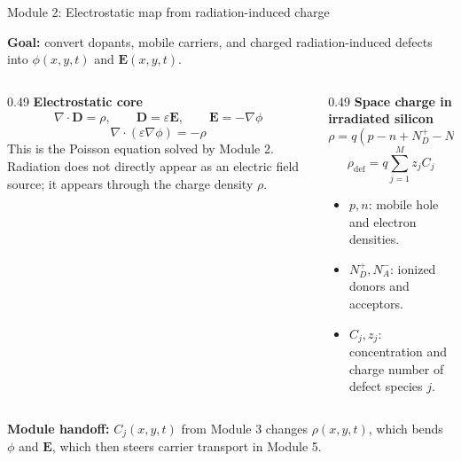\documentclass[aspectratio=169,9pt]{beamer}
\newcommand{\Evec}{\bm{E}}
\newcommand{\Dvec}{\bm{D}}
\newcommand{\rhoDef}{\rho_{\mathrm{def}}}
\begin{document}
\begin{frame}{Module 2: Electrostatic map from radiation-induced charge}
\footnotesize
\vspace{-4mm}
\begin{bluebox}
\centering\small
\textbf{Goal:} convert dopants, mobile carriers, and charged radiation-induced defects into \(\phi(x,y,t)\) and \(\Evec(x,y,t)\).
\end{bluebox}

\vspace{1mm}
\begin{columns}[T,totalwidth=\textwidth]
\begin{column}{0.49\textwidth}
\textbf{Electrostatic core}
\begin{align*}
\boxed{\nabla\cdot\Dvec=\rho},\qquad
\boxed{\Dvec=\varepsilon\Evec},\qquad
\boxed{\Evec=-\nabla\phi}
\end{align*}
\begin{equation*}
\boxed{\nabla\cdot\left(\varepsilon\nabla\phi\right)=-\rho}
\end{equation*}
\small
This is the Poisson equation solved by Module 2.  Radiation does not directly appear as an electric field source; it appears through the charge density \(\rho\).
\end{column}

\begin{column}{0.49\textwidth}
\textbf{Space charge in irradiated silicon}
\begin{equation*}
\boxed{\rho=q\left(p-n+N_D^+-N_A^-\right)+\rhoDef}
\end{equation*}
\begin{equation*}
\boxed{\rhoDef=q\sum_{j=1}^{M} z_j C_j}
\end{equation*}
\small
\begin{itemize}\setlength\itemsep{0.2mm}
\item \(p,n\): mobile hole and electron densities.
\item \(N_D^+,N_A^-\): ionized donors and acceptors.
\item \(C_j,z_j\): concentration and charge number of defect species \(j\).
\end{itemize}
\end{column}
\end{columns}

\vspace{1mm}
\begin{orangebox}
\centering\scriptsize
\textbf{Module handoff:} \(C_j(x,y,t)\) from Module 3 changes \(\rho(x,y,t)\), which bends \(\phi\) and \(\Evec\), which then steers carrier transport in Module 5.
\end{orangebox}
\end{frame}
\end{document}
